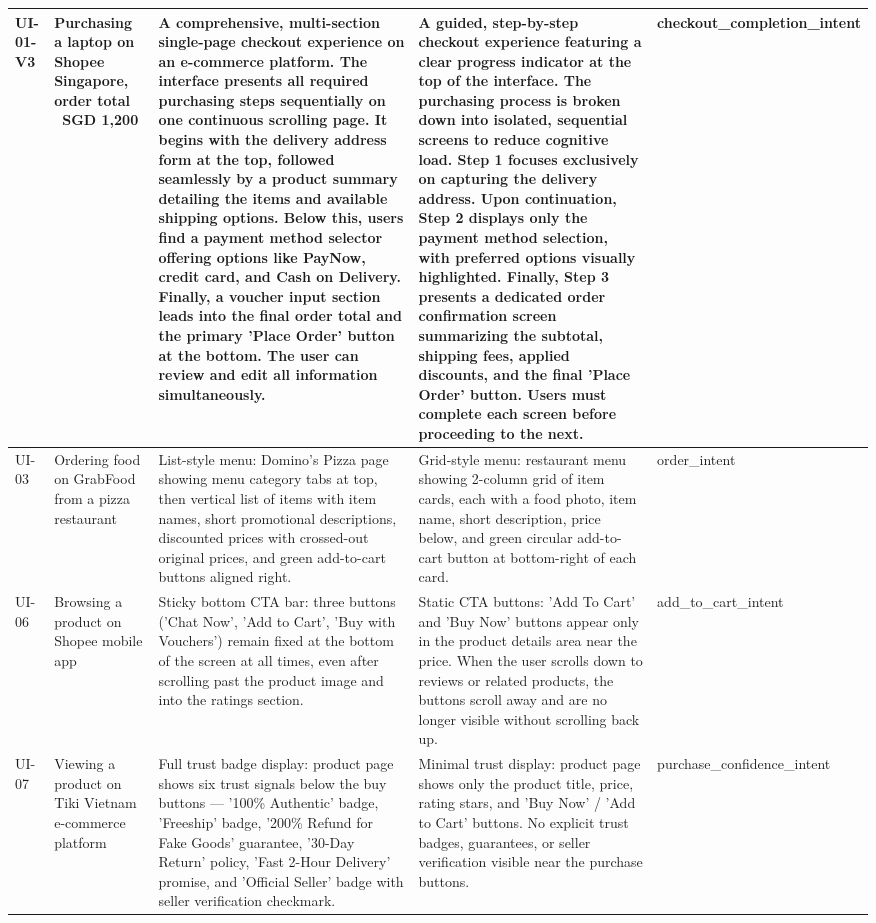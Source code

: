\begin{table}[h]
\begin{tabular}{p{1.5cm} p{3.5cm} p{4cm} p{4cm} p{2cm}}
\midrule
UI-01-V3 & Purchasing a laptop on Shopee Singapore, order total ~SGD 1,200 & A comprehensive, multi-section single-page checkout experience on an e-commerce platform. The interface presents all required purchasing steps sequentially on one continuous scrolling page. It begins with the delivery address form at the top, followed seamlessly by a product summary detailing the items and available shipping options. Below this, users find a payment method selector offering options like PayNow, credit card, and Cash on Delivery. Finally, a voucher input section leads into the final order total and the primary 'Place Order' button at the bottom. The user can review and edit all information simultaneously. & A guided, step-by-step checkout experience featuring a clear progress indicator at the top of the interface. The purchasing process is broken down into isolated, sequential screens to reduce cognitive load. Step 1 focuses exclusively on capturing the delivery address. Upon continuation, Step 2 displays only the payment method selection, with preferred options visually highlighted. Finally, Step 3 presents a dedicated order confirmation screen summarizing the subtotal, shipping fees, applied discounts, and the final 'Place Order' button. Users must complete each screen before proceeding to the next. & checkout_completion_intent \\
\midrule
UI-03 & Ordering food on GrabFood from a pizza restaurant & List-style menu: Domino's Pizza page showing menu category tabs at top, then vertical list of items with item names, short promotional descriptions, discounted prices with crossed-out original prices, and green add-to-cart buttons aligned right. & Grid-style menu: restaurant menu showing 2-column grid of item cards, each with a food photo, item name, short description, price below, and green circular add-to-cart button at bottom-right of each card. & order_intent \\
\midrule
UI-06 & Browsing a product on Shopee mobile app & Sticky bottom CTA bar: three buttons ('Chat Now', 'Add to Cart', 'Buy with Vouchers') remain fixed at the bottom of the screen at all times, even after scrolling past the product image and into the ratings section. & Static CTA buttons: 'Add To Cart' and 'Buy Now' buttons appear only in the product details area near the price. When the user scrolls down to reviews or related products, the buttons scroll away and are no longer visible without scrolling back up. & add_to_cart_intent \\
\midrule
UI-07 & Viewing a product on Tiki Vietnam e-commerce platform & Full trust badge display: product page shows six trust signals below the buy buttons — '100\% Authentic' badge, 'Freeship' badge, '200\% Refund for Fake Goods' guarantee, '30-Day Return' policy, 'Fast 2-Hour Delivery' promise, and 'Official Seller' badge with seller verification checkmark. & Minimal trust display: product page shows only the product title, price, rating stars, and 'Buy Now' / 'Add to Cart' buttons. No explicit trust badges, guarantees, or seller verification visible near the purchase buttons. & purchase_confidence_intent \\

\end{tabular}
\end{table}
